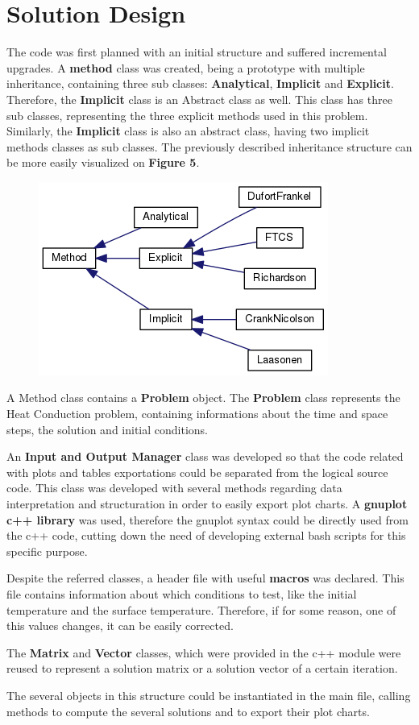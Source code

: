 \documentclass[12pt]{report}
\begin{document}
\section*{Solution Design}
\par The code was first planned with an initial structure and suffered incremental upgrades. A \textbf{method} class was created, being a prototype with multiple inheritance, containing three sub classes: \textbf{Analytical}, \textbf{Implicit} and \textbf{Explicit}. Therefore, the \textbf{Implicit} class is an Abstract class as well. This class has three sub classes, representing the three explicit methods used in this problem. Similarly, the \textbf{Implicit} class is also an abstract class, having two implicit methods classes as sub classes. The previously described inheritance structure can be more easily visualized on \textbf{Figure 5}.

\begin{figure}[!htb]
  \centering
  \includegraphics[width=.5\linewidth]{method_inheritance.png}
\end{figure}

\par A Method class contains a \textbf{Problem} object. The \textbf{Problem} class represents the Heat Conduction problem, containing informations about the time and space steps, the solution and initial conditions.
\par An \textbf{Input and Output Manager} class was developed so that the code related with plots and tables exportations could be separated from the logical source code. This class was developed with several methods regarding data interpretation and structuration in order to easily export plot charts. A \textbf{gnuplot c++ library} was used, therefore the gnuplot syntax could be directly used from the c++ code, cutting down the need of developing external bash scripts for this specific purpose.
\par Despite the referred classes, a header file with useful \textbf{macros} was declared. This file contains information about which conditions to test, like the initial temperature and the surface temperature. Therefore, if for some reason, one of this values changes, it can be easily corrected.
\par The \textbf{Matrix} and \textbf{Vector} classes, which were provided in the c++ module were reused to represent a solution matrix or a solution vector of a certain iteration.
\par The several objects in this structure could be instantiated in the main file, calling methods to compute the several solutions and to export their plot charts.
\end{document}
